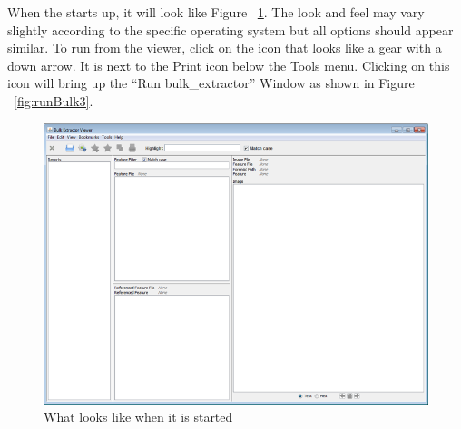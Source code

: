 \documentclass[11pt]{article} %
\begin{document}
When the \viewer starts up, it will look like Figure ~\ref{fig:startup}. The look and feel may vary slightly according to the specific operating system but all options should appear similar. To run \bulk from the viewer, click on the icon that looks like a gear with a down arrow. It is next to the Print icon below the Tools menu. Clicking on this icon will bring up the ``Run bulk\_extractor'' Window as shown in Figure ~\ref{fig:runBulk3}.\\
\begin{figure}
	\center
	\includegraphics[scale=.8]{viewerPics/startup.png}
	\caption{What \viewer looks like when it is started}
	\label{fig:startup}
\end{figure}
\end{document}
